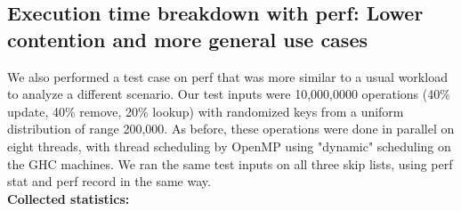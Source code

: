 \documentclass[11pt]{article}
\begin{document}
\subsection{Execution time breakdown with perf: Lower contention and more general use cases}
We also performed a test case on perf that was more similar to a usual workload to analyze a different scenario. Our test inputs were 10,000,0000 operations (40\% update, 40\% remove, 20\% lookup) with randomized keys from a uniform distribution of range 200,000. As before, these operations were done in parallel on eight threads, with thread scheduling by OpenMP using "dynamic" scheduling on the GHC machines. We ran the same test inputs on all three skip lists, using perf stat and perf record in the same way. \\
\textbf{Collected statistics:}
\end{document}
